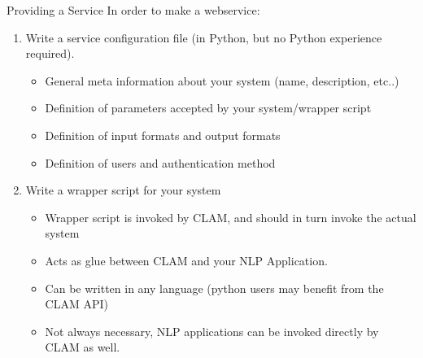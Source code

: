 \documentclass[compress]{beamer}
\begin{document}
\begin{frame}
    \begin{block}{Providing a Service}
        In order to make a webservice:
        \begin{enumerate}
            \item Write a service configuration file \footnotesize{(in Python, but no Python experience required)}. 
            \begin{itemize}
                \item General meta information about your system \footnotesize{(name, description, etc..)}
                \item Definition of parameters accepted by your system/wrapper script
                \item Definition of input formats and output formats
                \item Definition of users and authentication method
            \end{itemize}
            \item Write a wrapper script for your system
            \begin{itemize}
                \item Wrapper script is invoked by CLAM, and should in turn invoke the actual system
                \item Acts as glue between CLAM and your NLP Application.
                \item Can be written in any language (python users may benefit from the CLAM API)
                \item Not always necessary, NLP applications can be invoked directly by CLAM as well.
            \end{itemize}
        \end{enumerate}
    \end{block}

\end{frame}
\end{document}

